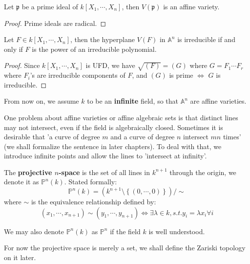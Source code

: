 \documentclass{note-eng}
\begin{document}
\begin{corollary}
    Let $\mathfrak{p}$ be a prime ideal of $k[X_1, \cdots, X_n]$, then $V(\mathfrak{p})$ is an affine variety.
\end{corollary}

\begin{proof}
    Prime ideals are radical.
\end{proof}

\begin{corollary}
    Let $F \in k[X_1, \cdots, X_n]$, then the hyperplane $V(F)$ in $\mathbb{A}^n$ is irreducible if and only if $F$ is the power of an irreducible polynomial.
\end{corollary}

\begin{proof}
    Since $k[X_1, \cdots, X_n]$ is UFD, we have $\sqrt{(F)} = (G)$ where $G = F_1 \cdots F_r$ where $F_i$'s are irreducible components of $F$, and $(G)$ is prime $\Leftrightarrow$ $G$ is irreducible.
\end{proof}


{\color{red}From now on, we assume $k$ to be an \textbf{infinite} field, so that $\mathbb{A}^n$ are affine varieties.}


One problem about affine varieties or affine algebraic sets is that distinct lines may not intersect, even if the field is algebraically closed. Sometimes it is desirable that 'a curve of degree $m$ and a curve of degree $n$ intersect $mn$ times' (we shall formalize the sentence in later chapters). To deal with that, we introduce infinite points and allow the lines to 'intersect at infinity'.

\begin{definition}
    The \textbf{projective $n$-space} is the set of all lines in $k^{n + 1}$ through the origin, we denote it as $\mathbb{P}^n(k)$. Stated formally:
    $$\mathbb{P}^n(k) = \left(k^{n + 1} \setminus \left\lbrace (0, \cdots, 0) \right\rbrace \right) / \sim$$
    where $\sim$ is the equivalence relationship defined by:
    $$(x_1, \cdots, x_{n + 1}) \sim (y_1, \cdots, y_{n + 1}) \Leftrightarrow \exists \lambda \in k, s.t. y_i = \lambda x_i \forall i$$
    
    We may also denote $\mathbb{P}^n(k)$ as $\mathbb{P}^n$ if the field $k$ is well understood.
\end{definition}

For now the projective space is merely a set, we shall define the Zariski topology on it later.
\end{document}
